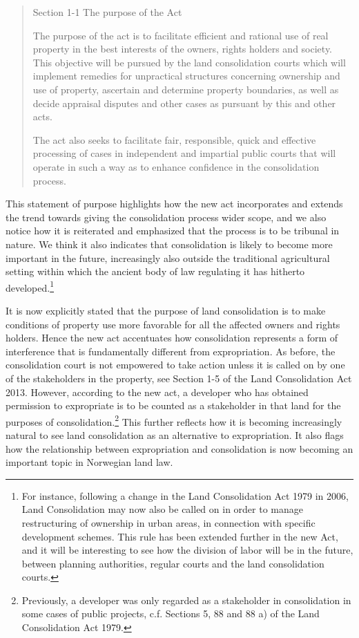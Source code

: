 \begin{quote}
Section 1-1 The purpose of the Act

The purpose of the act is to facilitate efficient and rational use of real property in the best interests of the owners, rights holders and society. This objective will be pursued by the land consolidation courts which will implement remedies for unpractical structures concerning ownership and use of property, ascertain and determine property boundaries, as well as decide appraisal disputes and other cases as pursuant by this and other acts.

The act also seeks to facilitate fair, responsible, quick and effective processing of cases in independent and impartial public courts that will operate in such a way as to enhance confidence in the consolidation process.
\end{quote}

This statement of purpose highlights how the new act incorporates and extends the trend towards giving the consolidation process wider scope, and we also notice how it is reiterated and emphasized that the process is to be tribunal in nature. We think it also indicates that consolidation is likely to become more important in the future, increasingly also outside the traditional agricultural setting within which the ancient body of law regulating it has hitherto developed.\footnote{For instance, following a change in the Land Consolidation Act 1979 in 2006, Land Consolidation may now also be called on in order to manage restructuring of ownership in urban areas, in connection with specific development schemes. This rule has been extended further in the new Act, and it will be interesting to see how the division of labor will be in the future, between planning authorities, regular courts and the land consolidation courts. }

It is now explicitly stated that the purpose of land consolidation is to make conditions of property use more favorable for all the affected owners and rights holders. Hence the new act accentuates how consolidation represents a form of interference that is fundamentally different from expropriation. As before, the consolidation court is not empowered to take action unless it is called on by one of the stakeholders in the property, see Section 1-5 of the Land Consolidation Act 2013. However, according to the new act, a developer who has obtained permission to expropriate is to be counted as a stakeholder in that land for the purposes of consolidation.\footnote{Previously, a developer was only regarded as a stakeholder in consolidation in some cases of public projects, c.f. Sections 5, 88 and 88 a) of the Land Consolidation Act 1979.} This further reflects how it is becoming increasingly natural to see land consolidation as an alternative to expropriation. It also flags how the relationship between expropriation and consolidation is now becoming an important topic in Norwegian land law.


